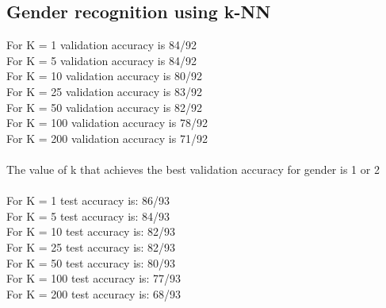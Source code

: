 \documentclass{article}
\begin{document}
\subsection{Gender recognition using k-NN}
For K = 1 validation accuracy is 84/92\\
For K = 5 validation accuracy is 84/92\\
For K = 10 validation accuracy is 80/92\\
For K = 25 validation accuracy is 83/92\\
For K = 50 validation accuracy is 82/92\\
For K = 100 validation accuracy is 78/92\\
For K = 200  validation accuracy is 71/92\\\\
The value of k that achieves the best validation accuracy for gender is 1 or 2\\\\
For K = 1 test accuracy is: 86/93\\
For K = 5  test accuracy is: 84/93\\
For K = 10  test accuracy is: 82/93\\
For K = 25  test accuracy is: 82/93\\
For K = 50  test accuracy is: 80/93\\
For K = 100  test accuracy is: 77/93\\
For K = 200  test accuracy is: 68/93\\
\end{document}
